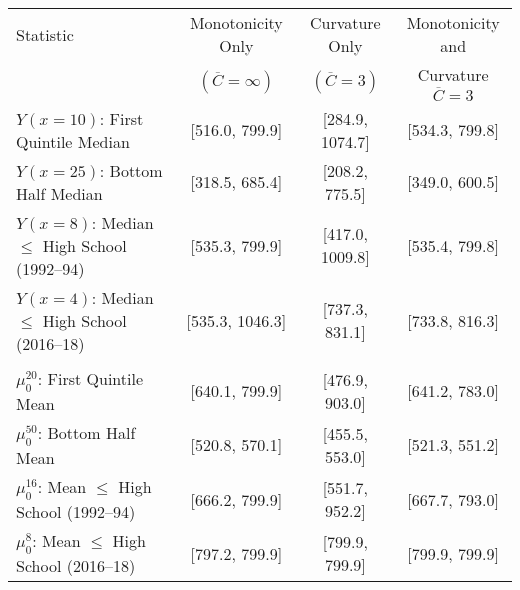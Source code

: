 \begin{tabular}{lccc}
\hline
Statistic                                    & Monotonicity Only                                 & Curvature Only                                            & Monotonicity and                                      \\
                                             & $(\overline{C}=\infty)$                           & $(\overline{C}=3)$                                        & Curvature $\overline{C}=3$                            \\
\hline
$Y(x=10)$: First Quintile Median              & [516.0, 799.9]   & [284.9, 1074.7]   & [534.3, 799.8]   \\
$Y(x=25)$: Bottom Half Median                 & [318.5, 685.4]   & [208.2, 775.5]   & [349.0, 600.5]   \\
$Y(x=8)$: Median $\le$ High School (1992--94)   & [535.3, 799.9]   & [417.0, 1009.8]   & [535.4, 799.8]   \\
$Y(x=4)$: Median $\le$ High School (2016--18)   & [535.3, 1046.3]   & [737.3, 831.1]   & [733.8, 816.3]   \\
\rule{0pt}{2ex}                              &                                                   &                                                           &                                                       \\
$\mu_0^{20}$: First Quintile Mean            & [640.1, 799.9] & [476.9, 903.0] & [641.2, 783.0] \\
$\mu_0^{50}$: Bottom Half Mean               & [520.8, 570.1] & [455.5, 553.0] & [521.3, 551.2] \\
$\mu_0^{16}$: Mean $\le$ High School (1992--94) & [666.2, 799.9] & [551.7, 952.2] & [667.7, 793.0] \\
$\mu_0^{8}$: Mean $\le$ High School (2016--18) & [797.2, 799.9] & [799.9, 799.9] & [799.9, 799.9] \\
\hline
\end{tabular}


